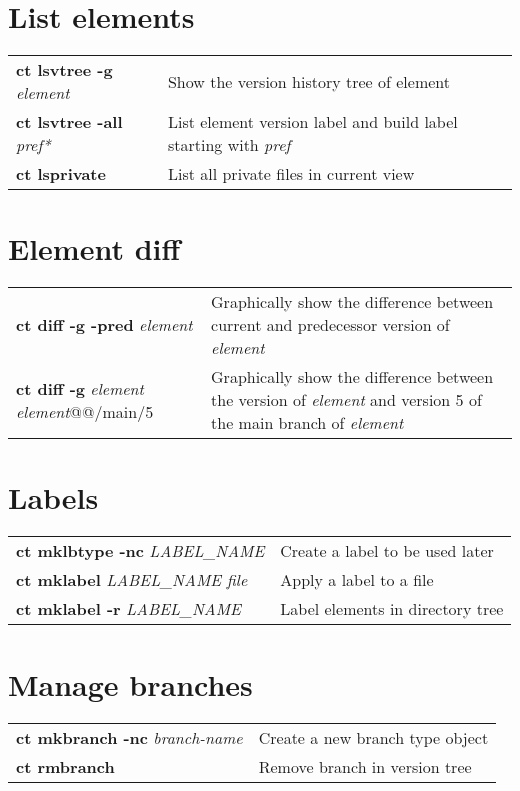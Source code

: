 \documentclass[10pt,twocolumn]{article}
\begin{document}
\section*{List elements}
\begin{tabularx}{10.2cm}{l|X}
  \textbf{ct lsvtree -g} \textit{element}    & Show the version history tree of element \\
  \textbf{ct lsvtree -all} \textit{pref*} & List element version label and build label starting with \textit{pref}\\
  \textbf{ct lsprivate}                   & List all private files in current view \\
\end{tabularx}

\section*{Element diff}
\begin{tabularx}{10.2cm}{>{\hsize=4.6cm}X|>{\hsize=4.7cm}X}
  \textbf{ct diff -g -pred} \textit{element}            & Graphically show the difference between current and predecessor version of \textit{element} \\ 
  \textbf{ct diff -g} \textit{element element}@@/main/5 & Graphically show the difference between the version of \textit{element} and version 5 of the main branch of \textit{element} \\
\end{tabularx}

\section*{Labels}
\begin{tabularx}{10.2cm}{l|X}
  \textbf{ct mklbtype -nc} \textit{LABEL\_NAME} & Create a label to be used later \\
 \textbf{ct mklabel} \textit{LABEL\_NAME file} & Apply a label to a file \\
 \textbf{ct mklabel -r} \textit{LABEL\_NAME} & Label elements in directory tree \\ 
\end{tabularx}

\section*{Manage branches}
\begin{tabularx}{10.2cm}{l|X}
 \textbf{ct mkbranch -nc} \textit{branch-name} & Create a new branch type object  \\ 
 \textbf{ct rmbranch} & Remove branch in version tree \\
\end{tabularx}
\end{document}
